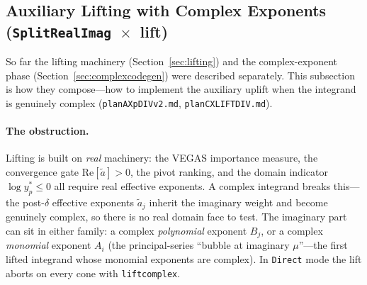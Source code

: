 \documentclass[11pt,a4paper]{article}
\begin{document}
\subsection{Auxiliary Lifting with Complex Exponents (\texttt{SplitRealImag}~$\times$~lift)}\label{sec:liftcomplex}

So far the lifting machinery (Section~\ref{sec:lifting}) and the complex-exponent phase (Section~\ref{sec:complexcodegen}) were described separately. This subsection is how they compose---how to implement the auxiliary uplift when the integrand is genuinely complex (\texttt{planAXpDIVv2.md}, \texttt{planCXLIFTDIV.md}).

\paragraph{The obstruction.} Lifting is built on \emph{real} machinery: the VEGAS importance measure, the convergence gate $\mathrm{Re}[\tilde a]>0$, the pivot ranking, and the domain indicator $\log y_p^*\leq 0$ all require real effective exponents. A complex integrand breaks this---the post-$\delta$ effective exponents $\tilde a_j$ inherit the imaginary weight and become genuinely complex, so there is no real domain face to test. The imaginary part can sit in either family: a complex \emph{polynomial} exponent $B_j$, or a complex \emph{monomial} exponent $A_i$ (the principal-series ``bubble at imaginary $\mu$''---the first lifted integrand whose monomial exponents are complex). In \texttt{Direct} mode the lift aborts on every cone with \texttt{liftcomplex}.
\end{document}
